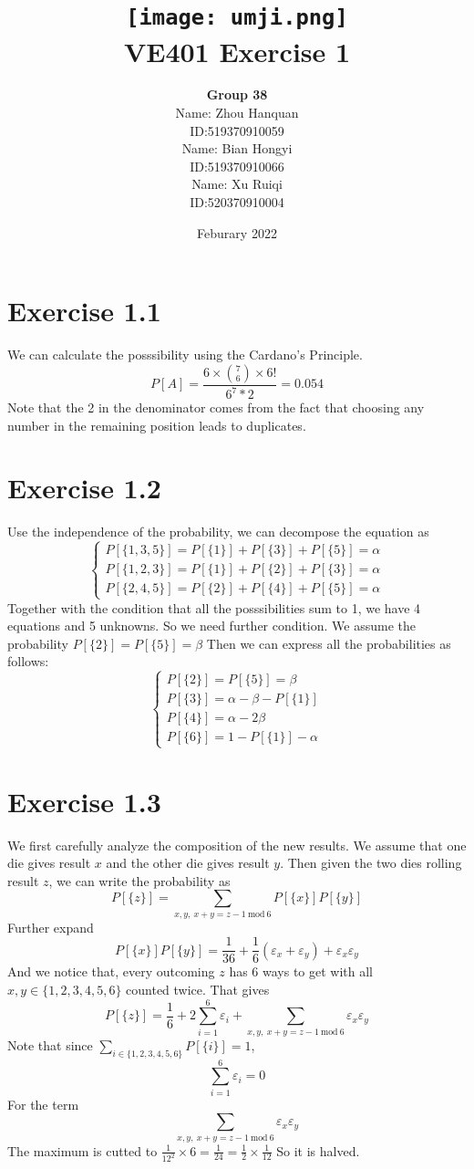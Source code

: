 \documentclass[12pt]{report}
\title
{
    {\texttt{[image: umji.png]}\\}
    {\huge VE401 Exercise 1}
}
\author
{
        {\textbf{Group 38}} \\
        {Name: Zhou Hanquan}\\
        {ID:519370910059}\\
        {Name: Bian Hongyi}\\
        {ID:519370910066}\\
        {Name: Xu Ruiqi}\\
        {ID:520370910004}
        
}
\date{Feburary 2022}
\begin{document}
\maketitle
\newpage

\section*{Exercise 1.1}
We can calculate the posssibility using the Cardano's Principle.
$$
    P[A] = \frac{6 \times \binom{7}{6} \times 6!}{6^{7}*2} = 0.054
$$
Note that the 2 in the denominator comes from the fact that choosing any number in the remaining position leads to duplicates.

\section*{Exercise 1.2}
Use the independence of the probability, we can decompose the equation as 
$$
\begin{cases}
    P[\{1,3,5\}] = P[\{1\}] + P[\{3\}] + P[\{5\}] = \alpha\\
    P[\{1,2,3\}] = P[\{1\}] + P[\{2\}] + P[\{3\}] = \alpha\\
    P[\{2,4,5\}] = P[\{2\}] + P[\{4\}] + P[\{5\}] = \alpha
\end{cases}
$$
Together with the condition that all the posssibilities sum to 1, we have 4 equations and 5 unknowns.
So we need further condition. We assume the probability $P[\{2\}] = P[\{5\}] = \beta$
Then we can express all the probabilities as follows:
$$
\begin{cases}
    P[\{2\}] = P[\{5\}] = \beta \\
    P[\{3\}] = \alpha - \beta - P[\{1\}] \\
    P[\{4\}] = \alpha - 2\beta \\
    P[\{6\}] = 1 - P[\{1\}] - \alpha
\end{cases}
$$

\section*{Exercise 1.3}
We first carefully analyze the composition of the new results. We assume that one die gives result $x$ and the other die gives result $y$. Then
given the two dies rolling result $z$, we can write the probability as
$$
    P[\{z\}] = \sum_{x,y, \ x+y = z - 1 \ \text{mod} \ 6} P[\{x\}]P[\{y\}] 
$$
Further expand
$$
    P[\{x\}]P[\{y\}] = \frac{1}{36} + \frac{1}{6}(\varepsilon_{x}+\varepsilon_{y})+ \varepsilon_{x}\varepsilon_{y}
$$
And we notice that, every outcoming $z$ has 6 ways to get with all $x,y \in \{1,2,3,4,5,6\}$ counted twice. That gives
$$
    P[\{z\}] = \frac{1}{6} + 2 \sum_{i = 1}^{6} \varepsilon_{i} + \sum_{x,y ,\ x+y = z-1 \ \text{mod} \ 6}\varepsilon_{x}\varepsilon_{y}
$$
Note that since $\sum_{i \in \{1,2,3,4,5,6\}} P[\{i\}] = 1$,
$$
    \sum_{i = 1}^{6} \varepsilon_{i} = 0
$$
For the term
$$
\sum_{x,y ,\ x+y = z-1 \ \text{mod} \ 6}\varepsilon_{x}\varepsilon_{y}
$$
The maximum is cutted to $\frac{1}{12^2} \times 6 = \frac{1}{24} = \frac{1}{2} \times \frac{1}{12}$
So it is halved.
\end{document}
